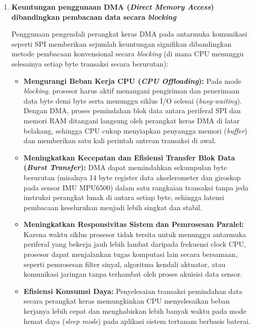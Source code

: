 \begin{enumerate}[label=\textbf{\arabic*.}, leftmargin=*, itemsep=10pt]
    \item \textbf{Keuntungan penggunaan DMA (\textit{Direct Memory Access}) dibandingkan pembacaan data secara \textit{blocking}}

    Penggunaan pengendali perangkat keras DMA pada antarmuka komunikasi seperti SPI memberikan sejumlah keuntungan signifikan dibandingkan metode pembacaan konvensional secara \textit{blocking} (di mana CPU menunggu selesainya setiap byte transaksi secara berurutan):
    \begin{itemize}
        \item \textbf{Mengurangi Beban Kerja CPU (\textit{CPU Offloading}):} Pada mode \textit{blocking}, prosesor harus aktif menangani pengiriman dan penerimaan data byte demi byte serta menunggu siklus I/O selesai (\textit{busy-waiting}). Dengan DMA, proses pemindahan blok data antara periferal SPI dan memori RAM ditangani langsung oleh perangkat keras DMA di latar belakang, sehingga CPU cukup menyiapkan penyangga memori (\textit{buffer}) dan memberikan satu kali perintah antrean transaksi di awal.
        \item \textbf{Meningkatkan Kecepatan dan Efisiensi Transfer Blok Data (\textit{Burst Transfer}):} DMA dapat memindahkan sekumpulan byte berurutan (misalnya 14 byte register data akselerometer dan giroskop pada sensor IMU MPU6500) dalam satu rangkaian transaksi tanpa jeda instruksi perangkat lunak di antara setiap byte, sehingga latensi pembacaan keseluruhan menjadi lebih singkat dan stabil.
        \item \textbf{Meningkatkan Responsivitas Sistem dan Pemrosesan Paralel:} Karena waktu siklus prosesor tidak tersita untuk menunggu antarmuka periferal yang bekerja jauh lebih lambat daripada frekuensi clock CPU, prosesor dapat menjalankan tugas komputasi lain secara bersamaan, seperti pemrosesan filter sinyal, algoritma kendali aktuator, atau komunikasi jaringan tanpa terhambat oleh proses akuisisi data sensor.
        \item \textbf{Efisiensi Konsumsi Daya:} Penyelesaian transaksi pemindahan data secara perangkat keras memungkinkan CPU menyelesaikan beban kerjanya lebih cepat dan menghabiskan lebih banyak waktu pada mode hemat daya (\textit{sleep mode}) pada aplikasi sistem tertanam berbasis baterai.
    \end{itemize}

\end{enumerate}